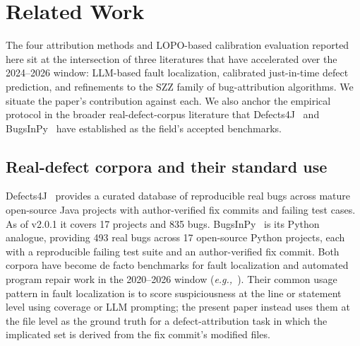 \documentclass[preprint,12pt]{elsarticle}
\begin{document}
\section{Related Work}
\label{sec:related}

The four attribution methods and LOPO-based calibration evaluation reported here sit at the intersection of three literatures that have accelerated over the 2024--2026 window: LLM-based fault localization, calibrated just-in-time defect prediction, and refinements to the SZZ family of bug-attribution algorithms. We situate the paper's contribution against each. We also anchor the empirical protocol in the broader real-defect-corpus literature that Defects4J~\cite{just2014defects4j} and BugsInPy~\cite{widyasari2020bugsinpy} have established as the field's accepted benchmarks.

\subsection{Real-defect corpora and their standard use}

Defects4J~\cite{just2014defects4j} provides a curated database of reproducible real bugs across mature open-source Java projects with author-verified fix commits and failing test cases. As of v2.0.1 it covers 17 projects and 835 bugs. BugsInPy~\cite{widyasari2020bugsinpy} is its Python analogue, providing 493 real bugs across 17 open-source Python projects, each with a reproducible failing test suite and an author-verified fix commit. Both corpora have become de facto benchmarks for fault localization and automated program repair work in the 2020--2026 window (\emph{e.g.,}~\cite{yang2024llmao,kang2024llmfl,rezaalipour2024pyfl}). Their common usage pattern in fault localization is to score suspiciousness at the line or statement level using coverage or LLM prompting; the present paper instead uses them at the file level as the ground truth for a defect-attribution task in which the implicated set is derived from the fix commit's modified files.
\end{document}

